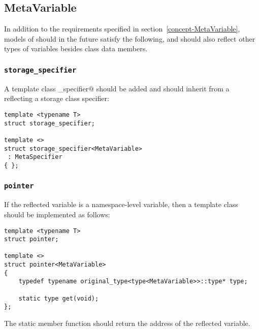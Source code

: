 \subsection{MetaVariable}

In addition to the requirements specified in section~\ref{concept-MetaVariable},
models of  should in the future satisfy the following,
and should also reflect other types of variables besides class data members.

\subsubsection{\texttt{storage\_specifier}}

A template class \verb@storage_specifier@ should be added and should
inherit from a  reflecting a storage class specifier:

\begin{verbatim}
template <typename T>
struct storage_specifier;

template <>
struct storage_specifier<MetaVariable>
 : MetaSpecifier
{ };
\end{verbatim}

\subsubsection{\texttt{pointer}}

If the reflected variable is a namespace-level variable, then a template
class \verb@pointer@ should be implemented as follows:

\begin{verbatim}
template <typename T>
struct pointer;

template <>
struct pointer<MetaVariable>
{
	typedef typename original_type<type<MetaVariable>>::type* type;

	static type get(void);
};
\end{verbatim}

The static member function \verb@get@ should return the address of the reflected variable.

